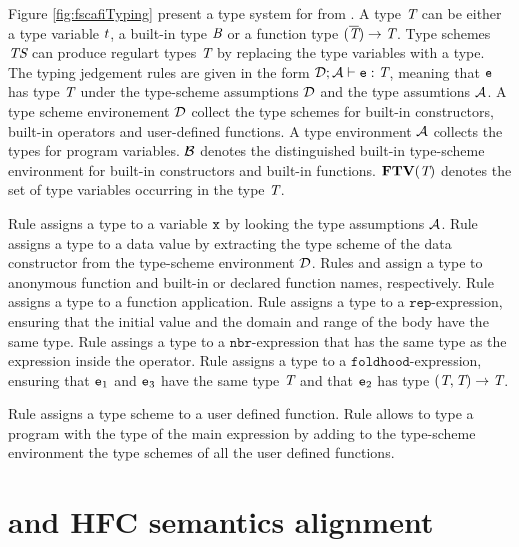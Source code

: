 Figure \ref{fig:fscafiTyping} present a type system for \FSCAFI from \cite{Scafi}. A type $\textit{T}$ can be either a type variable $t$, a built-in type $\textit{B}$ or a function type $(\overline{\textit{T}}) \rightarrow \textit{T}$. Type schemes $\textit{TS}$ can produce regulart types $\textit{T}$ by replacing the type variables with a type. The typing jedgement rules are given in the form $\mathcal{D} ; \mathcal{A} \vdash \mathtt{e} : \textit{T}$, meaning that $\mathtt{e}$ has type $\textit{T}$ under the type-scheme assumptions $\mathcal{D}$ and the type assumtions $\mathcal{A}$. A type scheme environement $\mathcal{D}$ collect the type schemes for built-in constructors, built-in operators and user-defined functions. A type environment $\mathcal{A}$ collects the types for program variables. $\mathcal{B}$ denotes the distinguished built-in type-scheme environment for built-in constructors and built-in functions. $\textbf{FTV}(\textit{T})$ denotes the set of type variables occurring in the type $\textit{T}$.

Rule  assigns a type to a variable $\mathtt{x}$ by looking the type assumptions $\mathcal{A}$. Rule  assigns a type to a data value by extracting the type scheme of the data constructor from the type-scheme environment $\mathcal{D}$. Rules  and  assign a type to anonymous function and built-in or declared function names, respectively. Rule  assigns a type to a function application. Rule  assigns a type to a $\mathtt{rep}$-expression, ensuring that the initial value and the domain and range of the body have the same type. Rule  assings a type to a $\mathtt{nbr}$-expression that has the same type as the expression inside the operator. Rule  assigns a type to a $\mathtt{foldhood}$-expression, ensuring that $\mathtt{e}_1$ and $\mathtt{e}_3$ have the same type $\textit{T}$ and that $\mathtt{e}_2$ has type $(\textit{T},\textit{T}) \to \textit{T}$.

Rule  assigns a type scheme to a user defined function. Rule  allows to type a program with the type of the main expression by adding to the type-scheme environment the type schemes of all the user defined functions.

\section{\Scafi{} and HFC semantics alignment}

